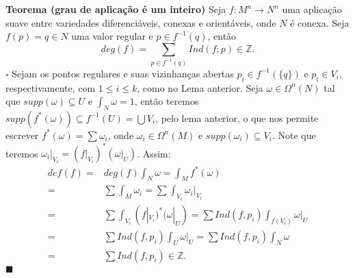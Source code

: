 \documentclass{article}
\begin{document}
	\vspace{2 mm}
	\textbf{Teorema (grau de aplicação é um inteiro)} Seja $f : M^{n} \to N^{n}$ uma aplicação suave entre variedades diferenciáveis, conexas e orientáveis, onde $N$ é conexa. Seja $f(p) = q \in N$ uma valor regular e $p \in f^{-1}(q)$, então
	$$
	deg(f) = \sum \limits_{p \in f^{-1}(q)} Ind(f;p) \in \mathbb{Z}.
	$$
	$\square$ Sejam os pontos regulares e suas vizinhanças abertas $p_{i} \in f^{-1}(\{q\})$ e $p_{i} \in V_{i}$, respectivamente, com $1\leq i \leq k$, como no Lema anterior. Seja $\omega \in \Omega^{n}(N)$ tal que $supp(\omega) \subseteq U$ e $\int_{N} \omega = 1$, então teremos $supp(f^{*}(\omega)) \subseteq f^{-1}(U) = \bigcup V_{i}$, pelo lema anterior, o que nos permite escrever $f^{*}(\omega) = \sum \omega_{i}$, onde $\omega_{i} \in \Omega^{n}(M)$ e $supp(\omega_{i}) \subseteq V_{i}$. Note que teremos $\omega_{i}|_{V_{i}}  = (f|_{V_{i}})^{*}(\omega|_{U})$. Assim:
	$$
	\begin{aligned}
	def(f) =& deg(f)\int_{N} \omega = \int_{M} f^{*}(\omega)
	\\
	=& \sum \int_{M}\omega_{i} = \sum \int_{V_{i}}\omega_{i}|_{V_{i}}
	\\
	=& \sum \int_{V_{i}} (f|_{V_{i}})^{*}(\omega|_{U}) = \sum Ind(f, p_{i}) \int_{f(V_{i})} \omega|_{U}
	\\
	=& \sum Ind(f, p_{i}) \int_{U} \omega|_{U} = \sum Ind(f, p_{i}) \int_{N} \omega
	\\
	=& \sum Ind(f, p_{i}) \in \mathbb{Z}.
	\end{aligned}$$
	$\blacksquare$
\end{document}

